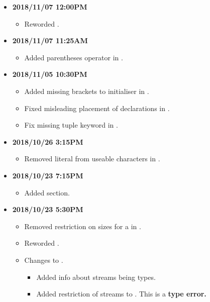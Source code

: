 \documentclass[../gazprea.tex]{subfiles}
\begin{document}
\begin{itemize}
  \item
    \textbf{2018/11/07 12:00PM}
    \begin{itemize}
      \item Reworded .
    \end{itemize}
  \item
    \textbf{2018/11/07 11:25AM}
    \begin{itemize}
      \item Added parentheses operator in  .
    \end{itemize}
  \item
    \textbf{2018/11/05 10:30PM}
    \begin{itemize}
      \item Added missing brackets to  initialiser in .
      \item Fixed misleading placement of declarations in .
      \item Fix missing tuple keyword in .
    \end{itemize}
  \item
    \textbf{2018/10/26 3:15PM}
    \begin{itemize}
      \item Removed literal \code{\\n} from useable characters in .
    \end{itemize}
  \item
    \textbf{2018/10/23 7:15PM}
    \begin{itemize}
      \item Added  section.
    \end{itemize}
  \item
    \textbf{2018/10/23 5:30PM}
    \begin{itemize}
      \item Removed restriction on sizes for a  in .
      \item Reworded .
      \item Changes to .
      \begin{itemize}
        \item Added info about streams being types.
        \item Added restriction of streams to .
          This is a \textbf{type error.}

\end{itemize}
\end{itemize}
\end{itemize}
\end{document}
